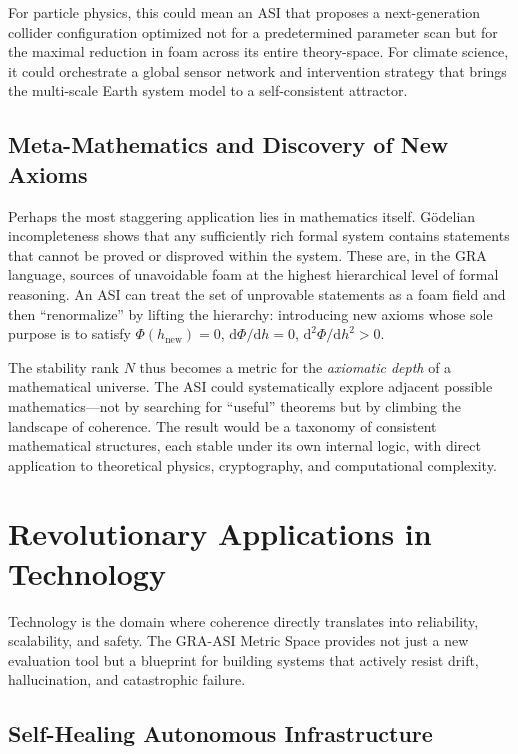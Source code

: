 \documentclass[11pt,a4paper]{article}
\begin{document}
For particle physics, this could mean an ASI that proposes a next-generation collider configuration optimized not for a predetermined parameter scan but for the maximal reduction in foam across its entire theory-space. For climate science, it could orchestrate a global sensor network and intervention strategy that brings the multi-scale Earth system model to a self-consistent attractor.

\subsection{Meta-Mathematics and Discovery of New Axioms}

Perhaps the most staggering application lies in mathematics itself. G\"odelian incompleteness shows that any sufficiently rich formal system contains statements that cannot be proved or disproved within the system. These are, in the GRA language, sources of unavoidable foam at the highest hierarchical level of formal reasoning. An ASI can treat the set of unprovable statements as a foam field and then ``renormalize'' by lifting the hierarchy: introducing new axioms whose sole purpose is to satisfy $\Phi(h_{\text{new}}) = 0$, $\mathrm{d}\Phi/\mathrm{d}h = 0$, $\mathrm{d}^2\Phi/\mathrm{d}h^2 > 0$.

The stability rank $N$ thus becomes a metric for the \emph{axiomatic depth} of a mathematical universe. The ASI could systematically explore adjacent possible mathematics---not by searching for ``useful'' theorems but by climbing the landscape of coherence. The result would be a taxonomy of consistent mathematical structures, each stable under its own internal logic, with direct application to theoretical physics, cryptography, and computational complexity.

\section{Revolutionary Applications in Technology}

Technology is the domain where coherence directly translates into reliability, scalability, and safety. The GRA-ASI Metric Space provides not just a new evaluation tool but a blueprint for building systems that actively resist drift, hallucination, and catastrophic failure.

\subsection{Self-Healing Autonomous Infrastructure}
\end{document}
